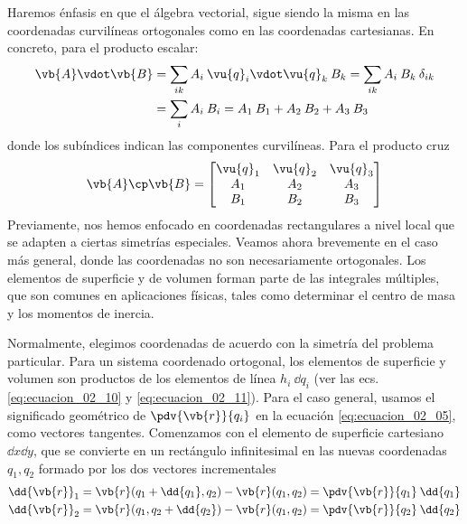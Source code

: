 Haremos énfasis en que el álgebra vectorial, sigue siendo la misma en las coordenadas curvilíneas ortogonales como en las coordenadas cartesianas. En concreto, para el producto escalar:
\begin{align}
\begin{aligned}
\vb{A} \vdot \vb{B} &= \sum_{ik} A_{i} \: \vu{q}_{i} \vdot \vu{q}_{k} \: B_{k} = \sum_{ik} A_{i} \: B_{k} \:  \delta_{ik} \\
&= \sum_{i} A_{i} \: B_{i} = A_{1} \: B_{1} + A_{2} \: B_{2} + A_{3} \: B_{3}
\end{aligned}
\label{eq:ecuacion_02_12}
\end{align}
donde los subíndices indican las componentes curvilíneas. Para el producto cruz
\begin{equation}
\vb{A} \cp \vb{B} = \begin{bmatrix}
\vu{q}_{1} & \vu{q}_{2} & \vu{q}_{3} \\
A_{1} & A_{2} & A_{3} \\
B_{1} & B_{2} & B_{3}
\end{bmatrix}
\label{eq:ecuacion_02_13}
\end{equation}
 Previamente, nos hemos enfocado en coordenadas rectangulares a nivel local que se adapten a ciertas simetrías especiales. Veamos ahora brevemente en el caso más general, donde las coordenadas no son necesariamente ortogonales. Los elementos de superficie y de volumen forman parte de las integrales múltiples, que son comunes en aplicaciones físicas, tales como determinar el centro de masa y los momentos de inercia.
 \par
Normalmente, elegimos coordenadas de acuerdo con la simetría del problema particular. Para un sistema coordenado ortogonal, los elementos de superficie y volumen son productos de los elementos de línea $h_{i} \: \dd{q_{i}}$ (ver las ecs. \ref{eq:ecuacion_02_10} y \ref{eq:ecuacion_02_11}). Para el caso general, usamos el significado geométrico de $\pdv{\vb{r}}{q_{i}}$ en la ecuación \ref{eq:ecuacion_02_05}, como vectores tangentes. Comenzamos con el elemento de superficie cartesiano $\dd{x} \dd{y}$, que se convierte en un rectángulo infinitesimal en las nuevas coordenadas $q_{1}, q_{2}$  formado por los dos vectores incrementales
\begin{align}
\begin{aligned}
\dd{\vb{r}}_{1} &= \vb{r} (q_{1} + \dd{q_{1}}, q_{2}) - \vb{r}(q_{1}, q_{2}) = \pdv{\vb{r}}{q_{1}} \: \dd{q_{1}} \\
\dd{\vb{r}}_{2} &= \vb{r} (q_{1}, q_{2} + \dd{q_{2}}) - \vb{r}(q_{1}, q_{2}) = \pdv{\vb{r}}{q_{2}}  \: \dd{q_{2}}
\end{aligned}
\label{eq:ecuacion_02_14}
\end{align}
